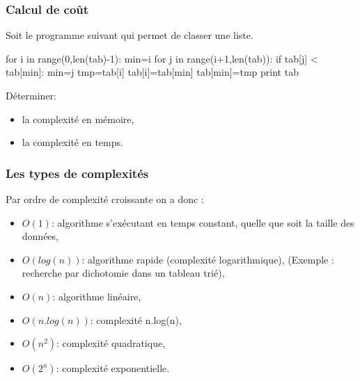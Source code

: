 \begin{frame}[fragile]
\frametitle{Calcul de coût}

Soit le programme suivant qui permet de classer une liste.

\begin{minipage}[t]{0.48\linewidth}
\begin{GrayBox}[0.85\textwidth]
\begin{verbatimtab}[3]
for i in range(0,len(tab)-1):
    min=i
    for j in range(i+1,len(tab)):
        if tab[j] < tab[min]:
            min=j
    tmp=tab[i]
    tab[i]=tab[min]
    tab[min]=tmp
print tab
\end{verbatimtab}
\end{GrayBox}
\end{minipage}\hfill
\begin{minipage}[t]{0.48\linewidth}
Déterminer:
\begin{itemize}
 \item la complexité en mémoire,
 \item la complexité en temps.
\end{itemize}

\end{minipage}


\end{frame}

\begin{frame}[fragile]
\frametitle{Les types de complexités}

Par ordre de complexité croissante on a donc :
\begin{itemize}
 \item $O(1)$: algorithme s'exécutant en temps constant, quelle que soit la taille des données,
 \item $O(log(n))$: algorithme rapide (complexité logarithmique), (Exemple : recherche par dichotomie dans un
tableau trié),
 \item $O(n)$: algorithme linéaire,
 \item $O(n.log(n))$: complexité n.log(n),
 \item $O(n^2)$: complexité quadratique,
 \item $O(2^n)$: complexité exponentielle.
\end{itemize}
\end{frame}

